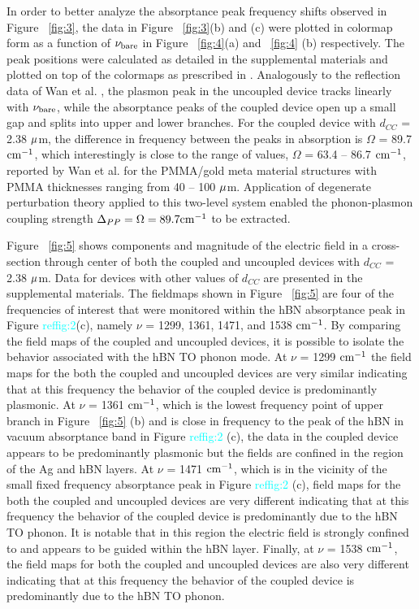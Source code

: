 \documentclass[
peprint,
amsmath,amssymb,
aip,
jap,
floatfix,
]{revtex4-2}
\begin{document}
    In order to better analyze the absorptance peak frequency shifts observed in Figure ~\ref{fig:3}, the data in Figure ~\ref{fig:3}(b) and (c) were plotted in colormap form as a function of $\nu_{\rm{bare}}$ in Figure ~\ref{fig:4}(a) and ~\ref{fig:4} (b) respectively. The peak positions were calculated as detailed in the supplemental materials and plotted on top of the colormaps as prescribed in \cite{Wan:16}. Analogously to the reflection data of Wan et al. \cite{Wan:16}, the plasmon peak in the uncoupled device tracks linearly with $\nu_{\rm{bare}}$, while the absorptance peaks of the coupled device open up a small gap and splits into upper and lower branches. For the coupled device with $d_{CC}$ = 2.38 $\rm \mu$m, the difference in frequency between the peaks in absorption is $\Omega$ = 89.7 $\rm cm^{-1}$, which interestingly is close to the range of values, $\Omega$ = 63.4 – 86.7 $\rm cm^{-1}$, reported by Wan et al. for the PMMA/gold meta material structures with PMMA thicknesses ranging from 40 – 100 $\rm \mu$m. Application of degenerate perturbation theory \cite{Sakurai:17} applied to this two-level system enabled the phonon-plasmon coupling strength $\Delta_{PP} = \rm  \Omega = 89.7 cm^{-1}$ to be extracted.

    Figure ~\ref{fig:5} shows components and magnitude of the electric field in a cross-section through center of both the coupled and uncoupled devices with $d_{CC}$  = 2.38 $\rm \mu$m. Data for devices with other values of $d_{CC}$  are presented in the supplemental materials. The fieldmaps shown in Figure ~\ref{fig:5} are four of the frequencies of interest that were monitored within the hBN absorptance peak in Figure  \textcolor{cyan}{ref{fig:2}}(c), namely $\nu$ = 1299, 1361, 1471, and 1538 $\rm cm^{-1}$. By comparing the field maps of the coupled and uncoupled devices, it is possible to isolate the behavior associated with the hBN TO phonon mode. At $\nu$ = 1299 $\rm cm^{-1}$ the field maps for the both the coupled and uncoupled devices are very similar indicating that at this frequency the behavior of the coupled device is predominantly plasmonic. At $\nu$ = 1361 $\rm cm^{-1}$, which is the lowest frequency point of upper branch in Figure ~\ref{fig:5} (b) and is close in frequency to the peak of the hBN in vacuum absorptance band in Figure  \textcolor{cyan}{ref{fig:2}} (c), the data in the coupled device appears to be predominantly plasmonic but the fields are confined in the region of the Ag and hBN layers. At $\nu$ = 1471 $\rm cm^{-1}$, which is in the vicinity of the small fixed frequency absorptance peak in Figure  \textcolor{cyan}{ref{fig:2}} (c), field maps for the both the coupled and uncoupled devices are very different indicating that at this frequency the behavior of the coupled device is predominantly due to the hBN TO phonon. It is notable that in this region the electric field is strongly confined to and appears to be guided within the hBN layer. Finally, at $\nu$ = 1538 $\rm cm^{-1}$, the field maps for both the coupled and uncoupled devices are also very different indicating that at this frequency the behavior of the coupled device is predominantly due to the hBN TO phonon.
\end{document}
